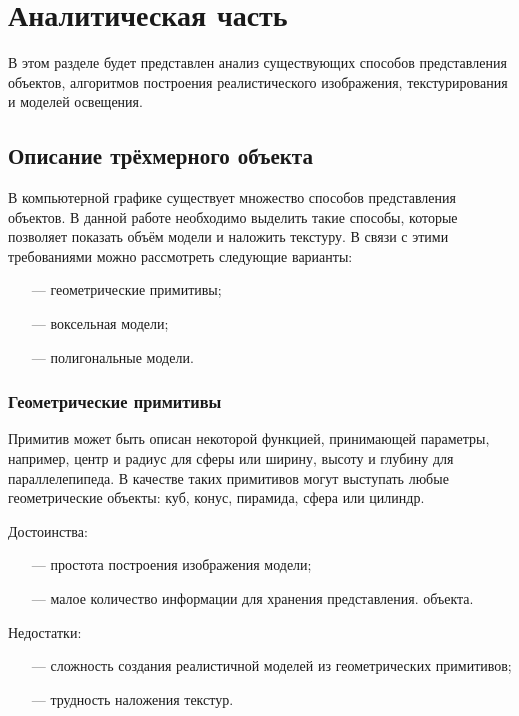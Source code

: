\section{Аналитическая часть}

В этом разделе будет представлен анализ существующих способов представления объектов, алгоритмов построения реалистического изображения, текстурирования и моделей освещения.

\subsection{Описание трёхмерного объекта}

В компьютерной графике существует множество способов представления объектов. В данной работе необходимо выделить такие способы, которые позволяет показать объём модели и наложить текстуру. В связи с этими требованиями можно рассмотреть следующие варианты:

\begin{itemize}[leftmargin=1.6\parindent]
	\item[---] геометрические примитивы;
	\item[---] воксельная модели;
	\item[---] полигональные модели.
\end{itemize}

\subsubsection{Геометрические примитивы}

Примитив может быть описан некоторой функцией, принимающей параметры, например, центр и радиус для сферы или ширину, высоту и глубину для параллелепипеда. В качестве таких примитивов могут выступать любые геометрические объекты: куб, конус, пирамида, сфера или цилиндр.

Достоинства:
\begin{itemize}[leftmargin=1.6\parindent]
	\item[---] простота построения изображения модели;
	\item[---] малое количество информации для хранения представления. объекта.
\end{itemize}

Недостатки:
\begin{itemize}
	\item[---] сложность создания реалистичной моделей из геометрических примитивов;
	\item[---] трудность наложения текстур.
\end{itemize}

